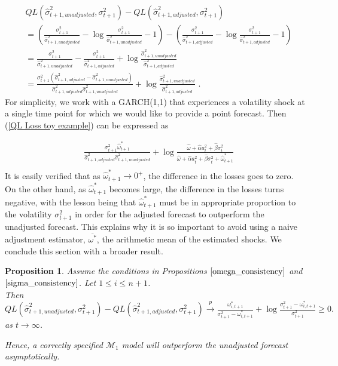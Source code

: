 \documentclass[11pt,3p,review,authoryear]{elsarticle}
\def\mc#1{\mathcal{#1}} %
\def\mc#1{\mathcal{#1}}
\newtheorem{prop}{Proposition}
\theoremstyle{definition}
\begin{document}
\begin{align}
  & QL(\hat\sigma_{t+1, unadjusted}^{2},\sigma^{2}_{t+1})-QL(\hat\sigma^{2}_{t+1, adjusted},\sigma^{2}_{t+1})\\
   & =(\frac{\sigma_{t+1}^{2}}{\hat\sigma^{2}_{t+1,unadjusted}} - \log{\frac{\sigma_{t+1}^{2}}{\hat\sigma^{2}_{t+1,unadjusted}} } - 1) - (\frac{\sigma_{t+1}^{2}}{\hat\sigma^{2}_{t+1,adjusted}} - \log{\frac{\sigma_{t+1}^{2}}{\hat\sigma^{2}_{t+1,adjusted}}} - 1)\\
   & = \frac{\sigma_{t+1}^{2}}{\hat\sigma^{2}_{t+1,unadjusted}} - \frac{\sigma_{t+1}^{2}}{\hat\sigma^{2}_{t+1,adjusted}}+ \log{\frac{\hat\sigma^{2}_{t+1,unadjusted}}{\hat\sigma^{2}_{t+1,adjusted}}}\\
   & = \frac{\sigma_{t+1}^{2}(\hat\sigma^{2}_{t+1,adjusted}-\hat\sigma^{2}_{t+1,unadjusted})}{\hat\sigma^{2}_{t+1,adjusted}\hat\sigma^{2}_{t+1,unadjusted}} + \log{\frac{\hat\sigma^{2}_{t+1,unadjusted}}{\hat\sigma^{2}_{t+1,adjusted}}}\label{QL Loss toy example} \text{ .}
\end{align}
For simplicity, we work with a GARCH(1,1) that experiences a volatility shock at a single time point for which we would like to provide a point forecast.  Then (\ref{QL Loss toy example}) can be expressed as

\begin{align*}
   &\frac{\sigma^{2}_{t+1}\hat\omega^{*}_{t+1} }{\hat\sigma^{2}_{t+1,adjusted}\hat\sigma^{2}_{t+1,unadjusted}} + \log{\frac{\hat\omega + \hat\alpha a_{t}^{2} + \hat\beta\sigma_{t}^{2}}{\hat\omega + \hat\alpha a_{t}^{2} + \hat\beta\sigma_{t}^{2} + \hat\omega^{*}_{t+1}}}\\
\end{align*}\label{QL Loss Consistency - GARCH(1,1)}
It is easily verified that as $\hat\omega^{*}_{t+1} \rightarrow 0^{+}$, the difference in the losses goes to zero.  On the other hand, as $\hat\omega^{*}_{t+1}$ becomes large, the difference in the losses turns negative, with the lesson being that $\hat\omega^{*}_{t+1}$ must be in appropriate proportion to the volatility $\sigma^{2}_{t+1}$ in order for the adjusted forecast to outperform the unadjusted forecast.  This explains why it is so important to avoid using a naive adjustment estimator, $\overline{\omega^{*}}$, the arithmetic mean of the estimated shocks.  We conclude this section with a broader result. 

\begin{prop}\label{asymptotic_consistency}
Assume the conditions in Propositions $\ref{omega_consistency}$ and $\ref{sigma_consistency}$.  Let $1\leq i\leq n+1$.\\
  Then $QL(\hat\sigma_{t+1, unadjusted}^{2},\sigma^{2}_{t+1})-QL(\hat\sigma^{2}_{t+1, adjusted},\sigma^{2}_{t+1})\xrightarrow{p} \frac{\omega_{i,t+1}^{*}}{\sigma^{2}_{t+1}-\omega_{i,t+1}^{*}} + \log{\frac{\sigma_{t+1}^{2}-\omega_{i,t+1}^{*}}{\sigma_{t+1}^{2}} } \geq 0. $ as $t\rightarrow \infty$.

Hence, a correctly specified $\mc{M}_1$ model will outperform the unadjusted forecast asymptotically.
\end{prop}
\end{document}
